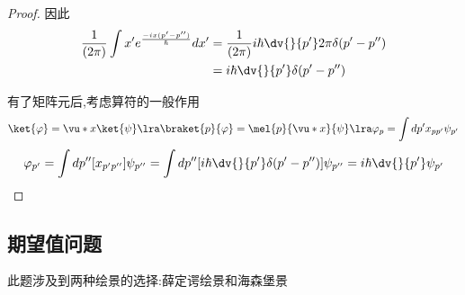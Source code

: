 \begin{proof}
                因此
                \begin{align*}
                     \frac{1}{(2 \pi)} \int x' e^{\frac{-ix(p'-p'')}{\hbar}}   dx' &=  \frac{1}{(2 \pi)}  i\hbar \dv{}{p'} 2\pi \delta(p'-p'')    \\
                                                                                  &= i \hbar \dv{}{p'} \delta(p'-p'')                          \\                                   
                \end{align*}

                有了矩阵元后,考虑算符的一般作用
                $$ \ket{\varphi} = \vu*{x} \ket{\psi} \lra \braket{p}{\varphi}=\mel{p}{\vu*{x}}{\psi} \lra \varphi_{p} = \int dp' x_{pp'} \psi_{p'}$$
                $$ \varphi_{p'} =  \int dp'' [x_{p'p''}] \psi_{p''} = \int dp'' [i \hbar \dv{}{p'} \delta(p'-p'')] \psi_{p''} = i\hbar \dv{}{p'} \psi_{p'} $$

                
            
            \end{proof}


        \subsection{期望值问题}
            此题涉及到两种绘景的选择:薛定谔绘景和海森堡景
            
